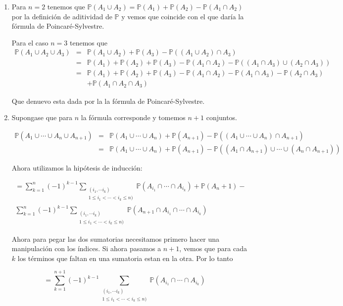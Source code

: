 \documentclass[letter,twoside,12pt]{article}
\begin{document}
\begin{enumerate}[label=\textbf{\arabic*)}]
\item Para $n=2$ tenemos que $ \mathbb{P}(A_1 \cup A_2)=\mathbb{P}(A_1)+\mathbb{P}(A_2)-\mathbb{P}(A_1 \cap A_2) $ por la definición de aditividad de $ \mathbb{P} $ y vemos que coincide con el que daría la fórmula de Poincaré-Sylvestre. 

Para el caso $ n = 3$ tenemos que 
\begin{eqnarray}
\mathbb{P}(A_1 \cup A_2 \cup A_3)&=&\mathbb{P}(A_1\cup A_2)+\mathbb{P}(A_3)-\mathbb{P}((A_1 \cup A_2) \cap A_3) \nonumber
\\&=& \mathbb{P}(A_1)+\mathbb{P}(A_2)+\mathbb{P}(A_3)-\mathbb{P}(A_1 \cap A_2)-\mathbb{P}((A_1 \cap A_3) \cup ( A_2 \cap A_3)) \nonumber
\\&=& \mathbb{P}(A_1)+\mathbb{P}(A_2)
+\mathbb{P}(A_3)-\mathbb{P}(A_1 \cap A_2)-\mathbb{P}(A_1 \cap A_3) - \mathbb{P}( A_2 \cap A_3) \nonumber
\\&&+\mathbb{P}(A_1 \cap A_2 \cap A_3) \nonumber
\end{eqnarray}

Que denuevo esta dada por la la fórmula de Poincaré-Sylvestre.
\item Supongase que para $ n $ la fórmula corresponde y tomemos $ n+1 $ conjuntos.

\begin{eqnarray}
\mathbb{P}(A_1 \cup \cdots \cup A_n \cup A_{n+1}) &=& \mathbb{P}(A_1 \cup \cdots \cup A_n)+ \mathbb{P}(A_{n+1})-\mathbb{P}((A_1 \cup \cdots \cup A_n) \cap A_{n+1}) \nonumber
\\ &=& \mathbb{P}(A_1 \cup \cdots \cup A_n)+ \mathbb{P}(A_{n+1})-\mathbb{P}((A_1 \cap A_{n+1}) \cup \cdots \cup( A_n \cap A_{n+1})) \nonumber
\end{eqnarray}

Ahora utilizamos la hipótesis de inducción:

\begin{multline}
=\sum_{k=1}^{n} (-1)^{k-1} \sum_{\substack{(i_1, \cdots i_k) \\1\leq i_1<\cdots<i_k\leq n)}}\mathbb{P}(A_{i_1} \cap \cdots \cap A_{i_k}) + \mathbb{P}(A_n+1)-\\\sum_{k=1}^{n} (-1)^{k-1} \sum_{\substack{(i_1, \cdots i_k) \\1\leq i_1<\cdots<i_k\leq n)}}\mathbb{P}(A_{n+1}\cap A_{i_1} \cap \cdots \cap A_{i_k}) \nonumber
\end{multline}

Ahora para pegar las dos sumatorias necesitamos primero hacer una manipulación con los índices. Si ahora pasamos a $ n+1 $, vemos que para cada $ k $ los términos que faltan en una sumatoria estan en la otra. Por lo tanto
\end{enumerate}
\begin{equation}
=\sum_{k=1}^{n+1} (-1)^{k-1} \sum_{\substack{(i_1, \cdots i_k) \\1\leq i_1<\cdots<i_k\leq n)}}\mathbb{P}(A_{i_1} \cap \cdots \cap A_{i_k}) \nonumber
\end{equation}
\end{document}

